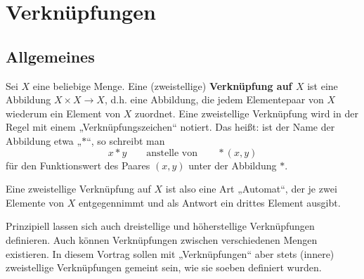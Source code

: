 



\chapter{Verknüpfungen}


\section{Allgemeines}


\begin{de} 
    Sei $X$ eine beliebige Menge. Eine (zweistellige) \textbf{Verknüpfung auf $X$} ist eine Abbildung $X\times X \to X$, d.h. eine Abbildung, die jedem Elementepaar von $X$ wiederum ein Element von $X$ zuordnet. Eine zweistellige Verknüpfung wird in der Regel mit einem „Verknüpfungszeichen“ notiert. Das heißt: ist der Name der Abbildung etwa „$*$“, so schreibt man
        \[ x*y \qquad\text{anstelle von}\qquad *(x,y) \]
    für den Funktionswert des Paares $(x,y)$ unter der Abbildung $*$.
\end{de}


\begin{bem}[* Verallgemeinerungen]
    Eine zweistellige Verknüpfung auf $X$ ist also eine Art „Automat“, der je zwei Elemente von $X$ entgegennimmt und als Antwort ein drittes Element ausgibt.
    
    Prinzipiell lassen sich auch dreistellige und höherstellige Verknüpfungen definieren. Auch können Verknüpfungen zwischen verschiedenen Mengen existieren. In diesem Vortrag sollen mit „Verknüpfungen“ aber stets (innere) zweistellige Verknüpfungen gemeint sein, wie sie soeben definiert wurden.
\end{bem}



